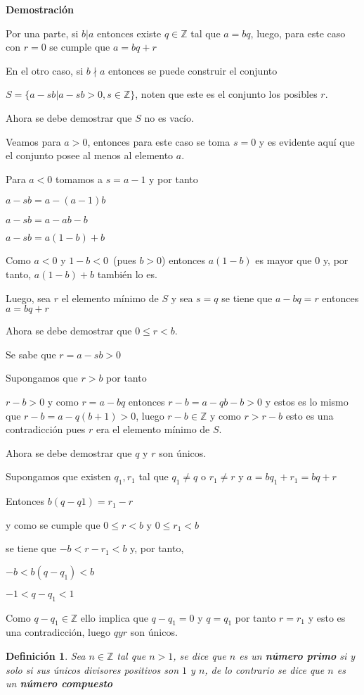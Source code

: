 \documentclass[a4paper,1pt]{report}
\newtheorem*{dfn}{Definición}
\begin{document}
\textbf{Demostración}

Por una parte, si $b|a$ entonces existe $q\in\mathbb{Z}$ tal que $a=bq$, luego, para este caso con $r=0$ se cumple que $a=bq+r$

En el otro caso, si $b\nmid a$ entonces se puede construir el conjunto 

$S=\{a-sb|a-sb>0, s\in\mathbb{Z}\}$, noten que este es el conjunto los posibles $r$.

Ahora se debe demostrar que $S$ no es vacío.

Veamos para $a>0$, entonces para este caso se toma $s=0$ y es evidente aquí que el conjunto posee al menos al elemento $a$.

Para $a<0$ tomamos a $s=a-1$ y por tanto

$a-sb=a-(a-1)b$

$a-sb=a-ab-b$

$a-sb=a(1-b)+b$

Como $a<0$ y $1-b<0$~(pues $b>0$) entonces $a(1-b)$ es mayor que 0 y, por tanto, $a(1-b)+b$ también lo es.

Luego, sea $r$ el elemento mínimo de $S$ y sea $s=q$ se tiene que $a-bq=r$ entonces $a=bq+r$

Ahora se debe demostrar que $0\leq r < b$.

Se sabe que $r=a-sb>0$

Supongamos que $r>b$ por tanto

$r-b>0$ y como $r=a-bq$ entonces $r-b=a-qb-b>0$ y estos es lo mismo que $r-b=a-q(b+1)>0$, luego $r-b\in\mathbb{Z}$ y como $r>r-b$ esto es una contradicción pues $r$ era el elemento mínimo de $S$.

Ahora se debe demostrar que $q$ y $r$ son únicos.

Supongamos que existen $q_1,r_1$ tal que $q_1\neq q$ o $r_1\neq r$ y $a=bq_1+r_1=bq+r$

Entonces $b(q-q1)=r_1-r$

y como se cumple que $0\leq r < b$ y $0\leq r_1 < b$

se tiene que $-b<r-r_1<b$ y, por tanto,

$-b<b(q-q_1)<b$

$-1<q-q_1<1$

Como $q-q_1\in\mathbb{Z}$ ello implica que $q-q_1=0$ y $q=q_1$ por tanto $r = r_1$ y esto es una contradicción, luego $q y r$ son únicos.



\begin{dfn}
 Sea $n\in\mathbb{Z}$ tal que $n>1$, se dice que $n$ es un \textbf{número primo} si y solo si sus únicos divisores positivos son $1$ y $n$, de lo contrario se dice que $n$ es un \textbf{número compuesto}
\end{dfn}
\end{document}

